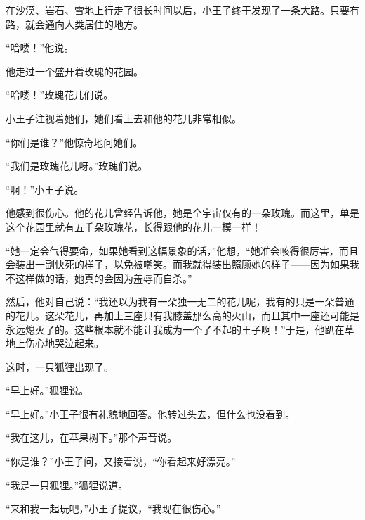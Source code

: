 {\startalignment[center]
 \stopalignment}


\stoptitle

\starttitle[title={20}]

在沙漠、岩石、雪地上行走了很长时间以后，小王子终于发现了一条大路。只要有路，就会通向人类居住的地方。

“哈喽！”他说。

他走过一个盛开着玫瑰的花园。

“哈喽！”玫瑰花儿们说。

小王子注视着她们，她们看上去和他的花儿非常相似。

“你们是谁？”他惊奇地问她们。

“我们是玫瑰花儿呀。”玫瑰们说。

“啊！”小王子说。

他感到很伤心。他的花儿曾经告诉他，她是全宇宙仅有的一朵玫瑰。而这里，单是这个花园里就有五千朵玫瑰花，长得跟他的花儿一模一样！

“她一定会气得要命，如果她看到这幅景象的话，”他想，“她准会咳得很厉害，而且会装出一副快死的样子，以免被嘲笑。而我就得装出照顾她的样子------因为如果我不这样做的话，她真的会因为羞辱而自杀。”

然后，他对自己说：“我还以为我有一朵独一无二的花儿呢，我有的只是一朵普通的花儿。这朵花儿，再加上三座只有我膝盖那么高的火山，而且其中一座还可能是永远熄灭了的。这些根本就不能让我成为一个了不起的王子啊！”于是，他趴在草地上伤心地哭泣起来。

{\startalignment[center]
 \stopalignment}


\stoptitle

\starttitle[title={21}]

这时，一只狐狸出现了。

“早上好。”狐狸说。

“早上好。”小王子很有礼貌地回答。他转过头去，但什么也没看到。

“我在这儿，在苹果树下。”那个声音说。

“你是谁？”小王子问，又接着说，“你看起来好漂亮。”

“我是一只狐狸。”狐狸说道。

“来和我一起玩吧，”小王子提议，“我现在很伤心。”

